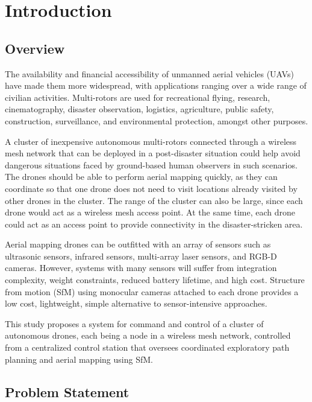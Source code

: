 \setlength{\footskip}{8mm}

\chapter{Introduction}

\textit{}

\section{Overview}
The availability and financial accessibility of unmanned aerial vehicles (UAVs) have made them more widespread, with applications ranging over a wide range of civilian activities. Multi-rotors are used for recreational flying, research, cinematography, disaster observation, logistics, agriculture,  public safety, construction, surveillance, and environmental protection, amongst other purposes. 

A cluster of inexpensive autonomous multi-rotors connected through a wireless mesh network that can be deployed in a post-disaster situation could help avoid dangerous situations faced by ground-based human observers in such scenarios. The drones should be able to perform aerial mapping quickly, as they can coordinate so that one drone does not need to visit locations already visited by other drones in the cluster. The range of the cluster can also be large, since each drone would act as a wireless mesh access point. At the same time, each drone could act as an access point to provide connectivity in the disaster-stricken area.  

Aerial mapping drones can be outfitted with an array of sensors such as ultrasonic sensors, infrared sensors, multi-array laser sensors, and RGB-D cameras. However, systems with many sensors will suffer from integration complexity, weight constraints, reduced battery lifetime, and high cost. Structure from motion (SfM) using monocular cameras attached to each drone provides a low cost, lightweight, simple alternative to sensor-intensive approaches. 

This study proposes a system for command and control of a cluster of autonomous drones, each being a node in a wireless mesh network, controlled from a centralized control station that oversees coordinated exploratory path planning and aerial mapping using SfM.

\section{Problem Statement}

